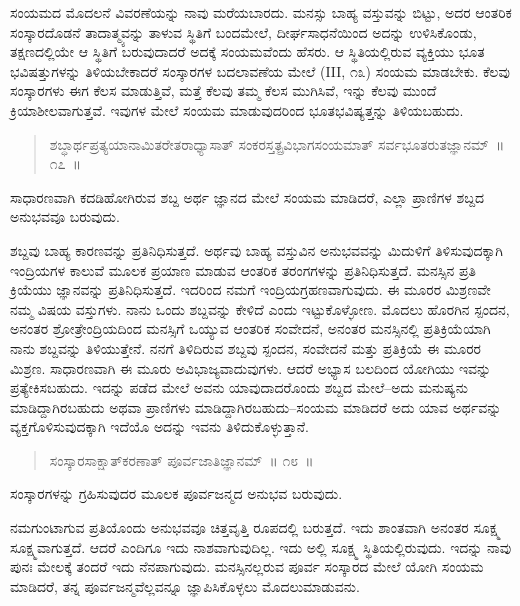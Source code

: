 ಸಂಯಮದ ಮೊದಲನೆ ವಿವರಣೆಯನ್ನು ನಾವು ಮರೆಯಬಾರದು. ಮನಸ್ಸು ಬಾಹ್ಯ ವಸ್ತುವನ್ನು ಬಿಟ್ಟು, ಅದರ ಆಂತರಿಕ ಸಂಸ್ಕಾರದೊಡನೆ ತಾದಾತ್ಮ್ಯವನ್ನು ತಾಳುವ ಸ್ಥಿತಿಗೆ ಬಂದಮೇಲೆ, ದೀರ್ಘಸಾಧನೆಯಿಂದ ಅದನ್ನು ಉಳಿಸಿಕೊಂಡು, ತಕ್ಷಣದಲ್ಲಿಯೇ ಆ ಸ್ಥಿತಿಗೆ ಬರುವುದಾದರೆ ಅದಕ್ಕೆ ಸಂಯಮವೆಂದು ಹೆಸರು. ಆ ಸ್ಥಿತಿಯಲ್ಲಿರುವ ವ್ಯಕ್ತಿಯು ಭೂತ ಭವಿಷತ್ತುಗಳನ್ನು ತಿಳಿಯಬೇಕಾದರೆ ಸಂಸ್ಕಾರಗಳ ಬದಲಾವಣೆಯ ಮೇಲೆ (III, ೧೩) ಸಂಯಮ ಮಾಡಬೇಕು. ಕೆಲವು ಸಂಸ್ಕಾರಗಳು ಈಗ ಕೆಲಸ ಮಾಡುತ್ತಿವೆ, ಮತ್ತೆ ಕೆಲವು ತಮ್ಮ ಕೆಲಸ ಮುಗಿಸಿವೆ, ಇನ್ನು ಕೆಲವು ಮುಂದೆ ಕ್ರಿಯಾಶೀಲವಾಗುತ್ತವೆ. ಇವುಗಳ ಮೇಲೆ ಸಂಯಮ ಮಾಡುವುದರಿಂದ ಭೂತಭವಿಷ್ಯತ್ತನ್ನು ತಿಳಿಯಬಹುದು.

\begin{verse}
ಶಬ್ಧಾರ್ಥಪ್ರತ್ಯಯಾನಾಮಿತರೇತರಾಧ್ಯಾಸಾತ್​ ಸಂಕರಸ್ತತ್ಪ್ರವಿಭಾಗಸಂಯಮಾತ್​ ಸರ್ವಭೂತರುತಜ್ಞಾನಮ್​~॥ ೧೭~॥
\end{verse}

ಸಾಧಾರಣವಾಗಿ ಕದಡಿಹೋಗಿರುವ ಶಬ್ದ ಅರ್ಥ ಜ್ಞಾನದ ಮೇಲೆ ಸಂಯಮ ಮಾಡಿದರೆ, ಎಲ್ಲಾ ಪ್ರಾಣಿಗಳ ಶಬ್ದದ ಅನುಭವವೂ ಬರುವುದು. 

ಶಬ್ದವು ಬಾಹ್ಯ ಕಾರಣವನ್ನು ಪ್ರತಿನಿಧಿಸುತ್ತದೆ. ಅರ್ಥವು ಬಾಹ್ಯ ವಸ್ತುವಿನ ಅನುಭವವನ್ನು ಮಿದುಳಿಗೆ ತಿಳಿಸುವುದಕ್ಕಾಗಿ ಇಂದ್ರಿಯಗಳ ಕಾಲುವೆ ಮೂಲಕ ಪ್ರಯಾಣ ಮಾಡುವ ಆಂತರಿಕ ತರಂಗಗಳನ್ನು ಪ್ರತಿನಿಧಿಸುತ್ತದೆ. ಮನಸ್ಸಿನ ಪ್ರತಿ ಕ್ರಿಯೆಯು ಜ್ಞಾನವನ್ನು ಪ್ರತಿನಿಧಿಸುತ್ತದೆ. ಇದರಿಂದ ನಮಗೆ ಇಂದ್ರಿಯಗ್ರಹಣವಾಗುವುದು. ಈ ಮೂರರ ಮಿಶ್ರಣವೇ ನಮ್ಮ ವಿಷಯ ವಸ್ತುಗಳು. ನಾನು ಒಂದು ಶಬ್ದವನ್ನು ಕೇಳಿದೆ ಎಂದು ಇಟ್ಟುಕೊಳ್ಳೋಣ. ಮೊದಲು ಹೊರಗಿನ ಸ್ಪಂದನ, ಅನಂತರ ಶ್ರೋತ್ರೇಂದ್ರಿಯದಿಂದ ಮನಸ್ಸಿಗೆ ಒಯ್ಯುವ ಆಂತರಿಕ ಸಂವೇದನೆ, ಅನಂತರ ಮನಸ್ಸಿನಲ್ಲಿ ಪ್ರತಿಕ್ರಿಯೆಯಾಗಿ ನಾನು ಶಬ್ದವನ್ನು ತಿಳಿಯುತ್ತೇನೆ. ನನಗೆ ತಿಳಿದಿರುವ ಶಬ್ದವು ಸ್ಪಂದನ, ಸಂವೇದನೆ ಮತ್ತು ಪ್ರತಿಕ್ರಿಯೆ ಈ ಮೂರರ ಮಿಶ್ರಣ. ಸಾಧಾರಣವಾಗಿ ಈ ಮೂರು ಅವಿಭಾಜ್ಯವಾದುವುಗಳು. ಆದರೆ ಅಭ್ಯಾಸ ಬಲದಿಂದ ಯೋಗಿಯು ಇವನ್ನು ಪ್ರತ್ಯೇಕಿಸಬಹುದು. ಇದನ್ನು ಪಡೆದ ಮೇಲೆ ಅವನು ಯಾವುದಾದರೊಂದು ಶಬ್ದದ ಮೇಲೆ–ಅದು ಮನುಷ್ಯನು ಮಾಡಿದ್ದಾಗಿರಬಹುದು ಅಥವಾ ಪ್ರಾಣಿಗಳು ಮಾಡಿದ್ದಾಗಿರಬಹುದು–ಸಂಯಮ ಮಾಡಿದರೆ ಅದು ಯಾವ ಅರ್ಥವನ್ನು ವ್ಯಕ್ತಗೊಳಿಸುವುದಕ್ಕಾಗಿ ಇದೆಯೊ ಅದನ್ನು ಇವನು ತಿಳಿದುಕೊಳ್ಳುತ್ತಾನೆ. 

\vspace{-0.3cm}

\begin{verse}
ಸಂಸ್ಕಾರಸಾಕ್ಷಾತ್​ಕರಣಾತ್​ ಪೂರ್ವಜಾತಿಜ್ಞಾನಮ್​~॥ ೧೮~॥
\end{verse}

\vspace{-0.3cm}

ಸಂಸ್ಕಾರಗಳನ್ನು ಗ್ರಹಿಸುವುದರ ಮೂಲಕ ಪೂರ್ವಜನ್ಮದ ಅನುಭವ ಬರುವುದು. 

ನಮಗುಂಟಾಗುವ ಪ್ರತಿಯೊಂದು ಅನುಭವವೂ ಚಿತ್ತವೃತ್ತಿ ರೂಪದಲ್ಲಿ ಬರುತ್ತದೆ. ಇದು ಶಾಂತವಾಗಿ ಅನಂತರ ಸೂಕ್ಷ್ಮ ಸೂಕ್ಷ್ಮವಾಗುತ್ತದೆ. ಆದರೆ ಎಂದಿಗೂ ಇದು ನಾಶವಾಗುವುದಿಲ್ಲ. ಇದು ಅಲ್ಲಿ ಸೂಕ್ಷ್ಮ ಸ್ಥಿತಿಯಲ್ಲಿರುವುದು. ಇದನ್ನು ನಾವು ಪುನಃ ಮೇಲಕ್ಕೆ ತಂದರೆ ಇದು ನೆನಪಾಗುವುದು. ಮನಸ್ಸಿನಲ್ಲರುವ ಪೂರ್ವ ಸಂಸ್ಕಾರದ ಮೇಲೆ ಯೋಗಿ ಸಂಯಮ ಮಾಡಿದರೆ, ತನ್ನ ಪೂರ್ವಜನ್ಮವೆಲ್ಲವನ್ನೂ ಜ್ಞಾಪಿಸಿಕೊಳ್ಳಲು ಮೊದಲುಮಾಡುವನು. 


